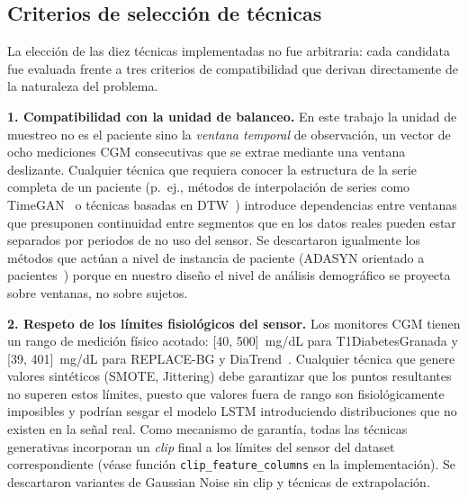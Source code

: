\subsection{Criterios de selección de técnicas}
\label{subsec:criterios_tecnicas}

La elección de las diez técnicas implementadas no fue arbitraria: cada candidata fue evaluada frente a tres criterios de compatibilidad que derivan directamente de la naturaleza del problema.

\textbf{1. Compatibilidad con la unidad de balanceo.} En este trabajo la unidad de muestreo no es el paciente sino la \emph{ventana temporal} de observación, un vector de ocho mediciones CGM consecutivas que se extrae mediante una ventana deslizante. Cualquier técnica que requiera conocer la estructura de la serie completa de un paciente (p.~ej., métodos de interpolación de series como TimeGAN~\cite{yoon2019timegan} o técnicas basadas en DTW~\cite{fawaz2018data}) introduce dependencias entre ventanas que presuponen continuidad entre segmentos que en los datos reales pueden estar separados por periodos de no uso del sensor. Se descartaron igualmente los métodos que actúan a nivel de instancia de paciente (ADASYN orientado a pacientes~\cite{he2008adasyn}) porque en nuestro diseño el nivel de análisis demográfico se proyecta sobre ventanas, no sobre sujetos.

\textbf{2. Respeto de los límites fisiológicos del sensor.} Los monitores CGM tienen un rango de medición físico acotado: [40, 500]~mg/dL para T1DiabetesGranada y [39, 401]~mg/dL para REPLACE-BG y DiaTrend~\cite{aleppo2017replace,dubosson2018diatrend}. Cualquier técnica que genere valores sintéticos (SMOTE, Jittering) debe garantizar que los puntos resultantes no superen estos límites, puesto que valores fuera de rango son fisiológicamente imposibles y podrían sesgar el modelo LSTM introduciendo distribuciones que no existen en la señal real. Como mecanismo de garantía, todas las técnicas generativas incorporan un \emph{clip} final a los límites del sensor del dataset correspondiente (véase función \texttt{clip\_feature\_columns} en la implementación). Se descartaron variantes de Gaussian Noise sin clip y técnicas de extrapolación.

